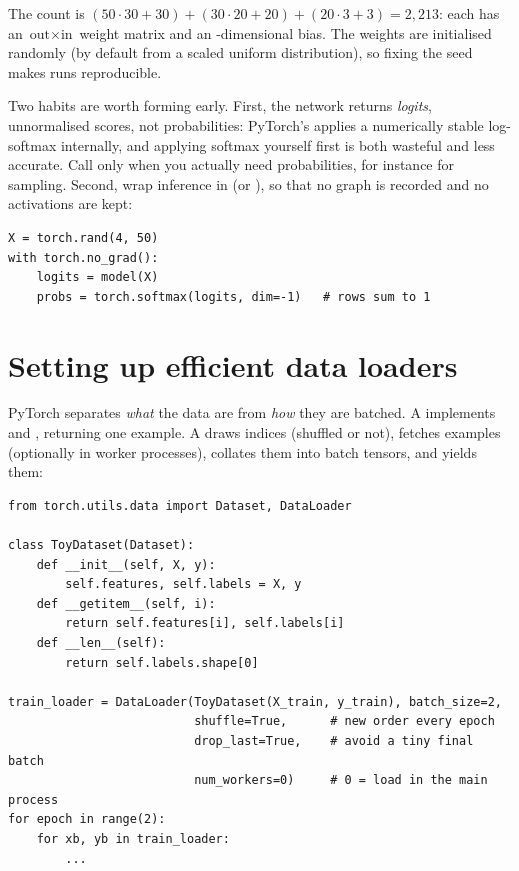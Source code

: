 The count is $(50\cdot30+30)+(30\cdot20+20)+(20\cdot3+3)=2{,}213$: each  has an
$\text{out}\times\text{in}$ weight matrix and an -dimensional bias. The weights are initialised randomly
(by default from a scaled uniform distribution), so fixing the seed makes runs reproducible.

Two habits are worth forming early. First, the network returns \emph{logits}, unnormalised scores, not
probabilities: PyTorch's  applies a numerically stable log-softmax internally, and
applying softmax yourself first is both wasteful and less accurate. Call 
only when you actually need probabilities, for instance for sampling. Second, wrap inference in
 (or ), so that no graph is recorded and no activations are kept:

\begin{lstlisting}[caption={Inference without building a graph.},label={lst:pytorch:nograd}]
X = torch.rand(4, 50)
with torch.no_grad():
    logits = model(X)
    probs = torch.softmax(logits, dim=-1)   # rows sum to 1
\end{lstlisting}

\section{Setting up efficient data loaders}\label{sec:pytorch:loaders}

PyTorch separates \emph{what} the data are from \emph{how} they are batched. A  implements
 and , returning one example. A  draws indices (shuffled
or not), fetches examples (optionally in worker processes), collates them into batch tensors, and yields
them:

\begin{lstlisting}[caption={A map-style dataset and its loader.},label={lst:pytorch:dataset}]
from torch.utils.data import Dataset, DataLoader

class ToyDataset(Dataset):
    def __init__(self, X, y):
        self.features, self.labels = X, y
    def __getitem__(self, i):
        return self.features[i], self.labels[i]
    def __len__(self):
        return self.labels.shape[0]

train_loader = DataLoader(ToyDataset(X_train, y_train), batch_size=2,
                          shuffle=True,      # new order every epoch
                          drop_last=True,    # avoid a tiny final batch
                          num_workers=0)     # 0 = load in the main process
for epoch in range(2):
    for xb, yb in train_loader:
        ...
\end{lstlisting}


